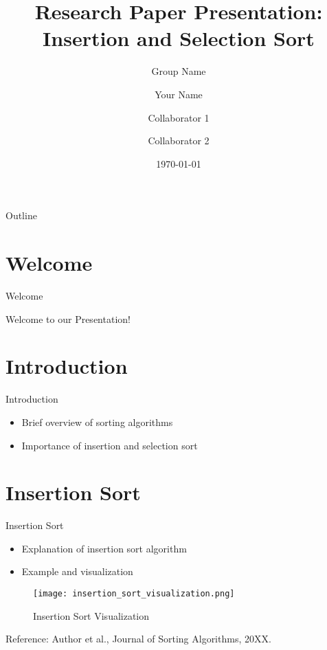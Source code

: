 \documentclass{beamer}
\title{Research Paper Presentation:\\Insertion and Selection Sort}
\subtitle{Group Name}
\author{Your Name \and Collaborator 1 \and Collaborator 2}
\institute{Your Institution}
\date{\today}
\begin{document}
\frame{\titlepage}

\begin{frame}{Outline}
  \tableofcontents
\end{frame}

\section{Welcome}
\begin{frame}{Welcome}
  \begin{center}
    \Huge Welcome to our Presentation!
  \end{center}
\end{frame}

\section{Introduction}
\begin{frame}{Introduction}
  \begin{itemize}
    \item Brief overview of sorting algorithms
    \item Importance of insertion and selection sort
  \end{itemize}
\end{frame}

\section{Insertion Sort}
\begin{frame}{Insertion Sort}
  \begin{itemize}
    \item Explanation of insertion sort algorithm
    \item Example and visualization
  \end{itemize}

  \vfill
  \begin{figure}
    \centering
    \texttt{[image: insertion\_sort\_visualization.png]}
    \caption{Insertion Sort Visualization}
    \label{fig:insertion-sort}
  \end{figure}

  \vfill
  \begin{flushright}
    \tiny{Reference: Author et al., Journal of Sorting Algorithms, 20XX.}
  \end{flushright}
\end{frame}
\end{document}
